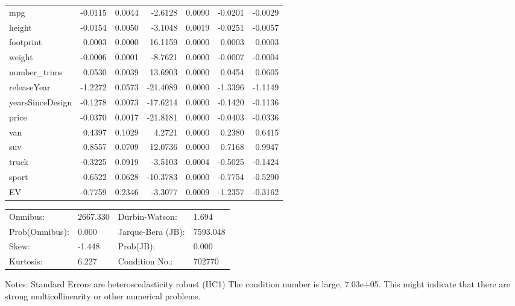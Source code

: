 \begin{table}
\begin{center}
\begin{tabular}{lrrrrrr}
mpg                & -0.0115 &   0.0044 &  -2.6128 &      0.0090 & -0.0201 & -0.0029  \\
height             & -0.0154 &   0.0050 &  -3.1048 &      0.0019 & -0.0251 & -0.0057  \\
footprint          &  0.0003 &   0.0000 &  16.1159 &      0.0000 &  0.0003 &  0.0003  \\
weight             & -0.0006 &   0.0001 &  -8.7621 &      0.0000 & -0.0007 & -0.0004  \\
number\_trims      &  0.0530 &   0.0039 &  13.6903 &      0.0000 &  0.0454 &  0.0605  \\
releaseYear        & -1.2272 &   0.0573 & -21.4089 &      0.0000 & -1.3396 & -1.1149  \\
yearsSinceDesign   & -0.1278 &   0.0073 & -17.6214 &      0.0000 & -0.1420 & -0.1136  \\
price              & -0.0370 &   0.0017 & -21.8181 &      0.0000 & -0.0403 & -0.0336  \\
van                &  0.4397 &   0.1029 &   4.2721 &      0.0000 &  0.2380 &  0.6415  \\
suv                &  0.8557 &   0.0709 &  12.0736 &      0.0000 &  0.7168 &  0.9947  \\
truck              & -0.3225 &   0.0919 &  -3.5103 &      0.0004 & -0.5025 & -0.1424  \\
sport              & -0.6522 &   0.0628 & -10.3783 &      0.0000 & -0.7754 & -0.5290  \\
EV                 & -0.7759 &   0.2346 &  -3.3077 &      0.0009 & -1.2357 & -0.3162  \\
\hline
\end{tabular}
\end{center}

\begin{center}
\begin{tabular}{llll}
\hline
Omnibus:       & 2667.330 & Durbin-Watson:    & 1.694     \\
Prob(Omnibus): & 0.000    & Jarque-Bera (JB): & 7593.048  \\
Skew:          & -1.448   & Prob(JB):         & 0.000     \\
Kurtosis:      & 6.227    & Condition No.:    & 702770    \\
\hline
\end{tabular}
\end{center}
\end{table}
\bigskip
Notes: \newline 
[1] Standard Errors are heteroscedasticity robust (HC1) \newline 
[2] The condition number is large, 7.03e+05. This might indicate                that there are strong multicollinearity or other numerical                problems.